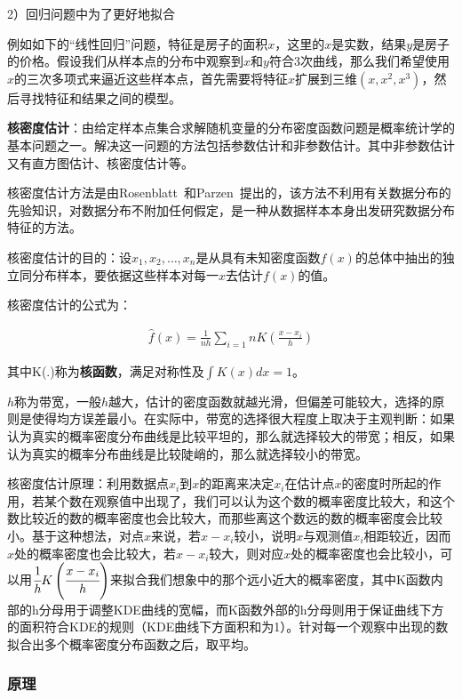 \documentclass[12pt]{article}
\begin{document}
2）回归问题中为了更好地拟合

例如如下的“线性回归”问题，特征是房子的面积$x$，这里的$x$是实数，结果$y$是房子的价格。假设我们从样本点的分布中观察到$x$和$y$符合$3$次曲线，那么我们希望使用$x$的三次多项式来逼近这些样本点，首先需要将特征$x$扩展到三维$(x, x^2, x^3)$，然后寻找特征和结果之间的模型。

\textbf{核密度估计}：由给定样本点集合求解随机变量的分布密度函数问题是概率统计学的基本问题之一。解决这一问题的方法包括参数估计和非参数估计。其中非参数估计又有直方图估计、核密度估计等。

核密度估计方法是由Rosenblatt~\cite{rosenblatt1956remarks}和Parzen~\cite{parzen1962estimation}提出的，该方法不利用有关数据分布的先验知识，对数据分布不附加任何假定，是一种从数据样本本身出发研究数据分布特征的方法。

核密度估计的目的：设$x_1, x_2, \ldots, x_n$是从具有未知密度函数$f(x)$的总体中抽出的独立同分布样本，要依据这些样本对每一$x$去估计$f(x)$的值。

核密度估计的公式为：

\begin{align}
\hat{f}(x) = \frac{1}{nh}\sum_{i=1}{n}K(\frac{x-x_i}{h})
\end{align}

其中K(.)称为\textbf{核函数}，满足对称性及$\int K(x)dx=1$。

$h$称为带宽，一般$h$越大，估计的密度函数就越光滑，但偏差可能较大，选择的原则是使得均方误差最小。在实际中，带宽的选择很大程度上取决于主观判断：如果认为真实的概率密度分布曲线是比较平坦的，那么就选择较大的带宽；相反，如果认为真实的概率分布曲线是比较陡峭的，那么就选择较小的带宽。

核密度估计原理：利用数据点$x_i$到$x$的距离来决定$x_i$在估计点$x$的密度时所起的作用，若某个数在观察值中出现了，我们可以认为这个数的概率密度比较大，和这个数比较近的数的概率密度也会比较大，而那些离这个数远的数的概率密度会比较小。基于这种想法，对点$x$来说，若$x-x_i$较小，说明$x$与观测值$x_i$相距较近，因而$x$处的概率密度也会比较大，若$x-x_i$较大，则对应$x$处的概率密度也会比较小，可以用$\cfrac{1}{h}K\left(\cfrac{x-x_i}{h}\right)$来拟合我们想象中的那个远小近大的概率密度，其中K函数内部的h分母用于调整KDE曲线的宽幅，而K函数外部的h分母则用于保证曲线下方的面积符合KDE的规则（KDE曲线下方面积和为1）。针对每一个观察中出现的数拟合出多个概率密度分布函数之后，取平均。

\subsubsection{原理}
\end{document}

